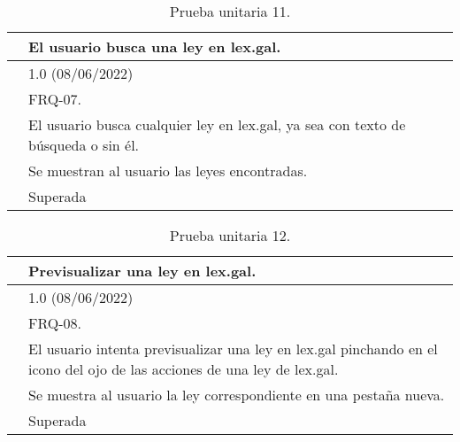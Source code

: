\begin{table}[H]
\begin{center}
\begin{tabular}{|p{3cm}|p{10cm}|} \hline
\centering {\bf PU-11} & El usuario busca una ley en lex.gal.  \\ \hline\hline
\centering {\bf Versión} & 1.0 (08/06/2022) \\ \hline
\centering {\bf Dependencias} & FRQ-07. \\ \hline
\centering {\bf Descripción} &  El usuario busca cualquier ley en lex.gal, ya sea con texto de búsqueda o sin él. \\ \hline
\centering {\bf Criterio de aceptación} & Se muestran al usuario las leyes encontradas. \\ \hline
\centering {\bf Estado} & Superada \\ \hline
\end{tabular}
\caption{Prueba unitaria 11.}
\label{enlacePU11}
\end{center}
\end{table}

\begin{table}[H]
\begin{center}
\begin{tabular}{|p{3cm}|p{10cm}|} \hline
\centering {\bf PU-12} & Previsualizar una ley en lex.gal.  \\ \hline\hline
\centering {\bf Versión} & 1.0 (08/06/2022) \\ \hline
\centering {\bf Dependencias} & FRQ-08. \\ \hline
\centering {\bf Descripción} &  El usuario intenta previsualizar una ley en lex.gal pinchando en el icono del ojo de las acciones de una ley de lex.gal. \\ \hline
\centering {\bf Criterio de aceptación} & Se muestra al usuario la ley correspondiente en una pestaña nueva. \\ \hline
\centering {\bf Estado} & Superada \\ \hline
\end{tabular}
\caption{Prueba unitaria 12.}
\label{enlacePU12}
\end{center}
\end{table}

